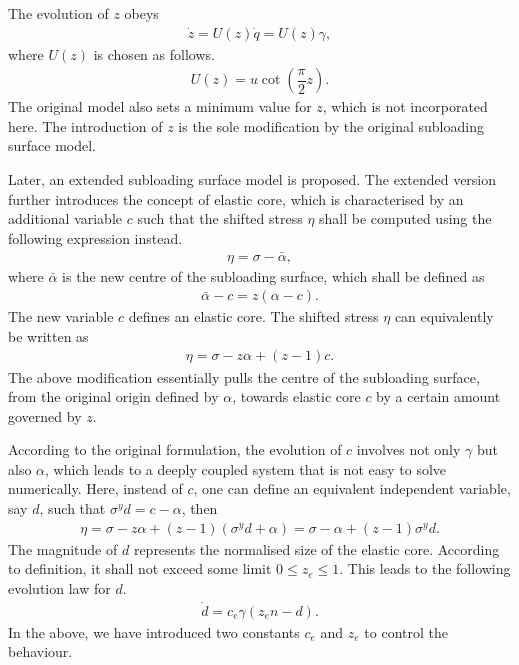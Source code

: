 The evolution of $z$ obeys
\begin{gather}
\dot{z}=U\left(z\right)\dot{q}=U\left(z\right)\gamma,
\end{gather}
where $U\left(z\right)$ is chosen as follows.
\begin{gather}
U\left(z\right)=u\cot\left(\dfrac{\pi}{2}z\right).
\end{gather}
The original model also sets a minimum value for $z$, which is not incorporated here.
The introduction of $z$ is the sole modification by the original subloading surface model.

Later, an extended subloading surface model is proposed.
The extended version further introduces the concept of elastic core, which is characterised by an additional variable $c$ such that the shifted stress $\eta$ shall be computed using the following expression instead.
\begin{gather}
\eta=\sigma-\bar{\alpha},
\end{gather}
where $\bar{\alpha}$ is the new centre of the subloading surface, which shall be defined as
\begin{gather}
\bar{\alpha}-c=z\left(\alpha-c\right).
\end{gather}
The new variable $c$ defines an elastic core.
The shifted stress $\eta$ can equivalently be written as
\begin{gather}
\eta=\sigma-z\alpha+\left(z-1\right)c.
\end{gather}
The above modification essentially pulls the centre of the subloading surface, from the original origin defined by $\alpha$, towards elastic core $c$ by a certain amount governed by $z$.

According to the original formulation, the evolution of $c$ involves not only $\gamma$ but also $\alpha$, which leads to a deeply coupled system that is not easy to solve numerically.
Here, instead of $c$, one can define an equivalent independent variable, say $d$, such that $\sigma^yd=c-\alpha$, then
\begin{gather}
\eta=\sigma-z\alpha+\left(z-1\right)\left(\sigma^yd+\alpha\right)=\sigma-\alpha+\left(z-1\right)\sigma^yd.
\end{gather}
The magnitude of $d$ represents the normalised size of the elastic core.
According to definition, it shall not exceed some limit $0\leqslant{}z_e\leqslant1$.
This leads to the following evolution law for $d$.
\begin{gather}
\dot{d}=c_e\gamma\left(z_en-d\right).
\end{gather}
In the above, we have introduced two constants $c_e$ and $z_e$ to control the behaviour.

